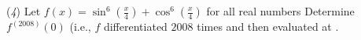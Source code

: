 (\textit{4}) Let $ f(x) = \sin^6\left(\frac {x}{4}\right) + \cos^6\left(\frac {x}{4}\right)$ for all real numbers  Determine $ f^{(2008)}(0)$ (i.e., $ f$ differentiated $ 2008$ times and then evaluated at .